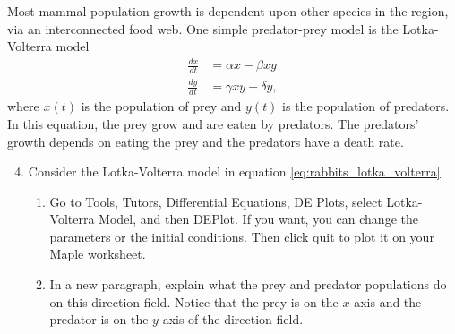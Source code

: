 Most mammal population growth is dependent upon other species in the region, via an interconnected food web. One simple predator-prey model is the Lotka-Volterra model
\begin{align}
\label{eq:rabbits_lotka_volterra}
\frac{dx}{dt} &= \alpha x-\beta xy\\
\frac{dy}{dt} &= \gamma xy-\delta y,\nonumber
\end{align}
where $x(t)$ is the population of prey and $y(t)$ is the population of predators. In this equation, the prey grow and are eaten by predators. The predators' growth depends on eating the prey and the predators have a death rate.

\begin{enumerate}
\setcounter{enumi}{3}
\item Consider the Lotka-Volterra model in equation \eqref{eq:rabbits_lotka_volterra}.
\begin{enumerate}
    \item Go to Tools, Tutors, Differential Equations, DE Plots, select Lotka-Volterra Model, and then DEPlot. If you want, you can change the parameters or the initial conditions. Then click quit to plot it on your Maple worksheet. 
    \item In a new paragraph, explain what the prey and predator populations do on this direction field. Notice that the prey is on the $x$-axis and the predator is on the $y$-axis of the direction field.
\end{enumerate}
\end{enumerate}
